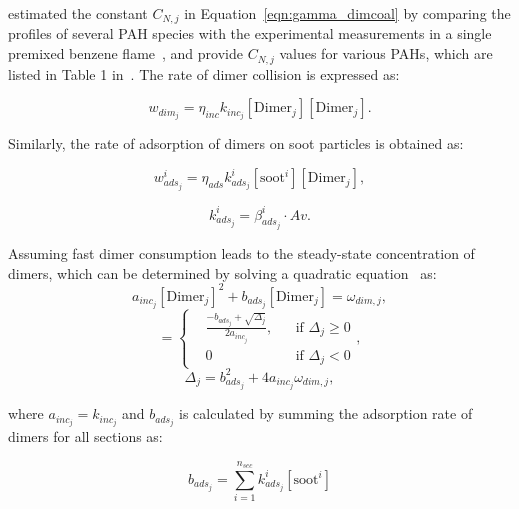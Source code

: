\citet{blanquart2009joint} estimated the constant ${C_{N,j}}$ in Equation~\eqref{eqn:gamma_dimcoal} by comparing the profiles of several PAH species with the experimental measurements in a single premixed benzene flame~\citep{tregrossi1999combustion}, and provide ${C_{N,j}}$ values for various PAHs, which are listed in Table 1 in~\citep{blanquart2009analyzing}. The rate of dimer collision is expressed as:

\begin{equation}
	w_{dim_j} = \eta_{inc} k_{inc_{j}} [\mathrm{Dimer}_j] [\mathrm{Dimer}_j].
	\label{eqn:wdim_dimcoal}
\end{equation}


Similarly, the rate of adsorption of dimers on soot particles is obtained as:

\begin{equation}
	w^i_{ads_j} = \eta_{ads} k^i_{ads_{j}} [\mathrm{soot}^i] [\mathrm{Dimer}_j],
\end{equation}

\begin{equation}
	k^i_{ads_{j}}=
	\beta^i_{ads_j}\cdot Av.
	\label{eqn:kads_dimcoal}
\end{equation}

Assuming fast dimer consumption leads to the steady-state concentration of dimers, which can be determined by solving a quadratic equation~\citep{blanquart2009analyzing} as:
\begin{equation}
	a_{inc_j}[\mathrm{Dimer}_j]^2+b_{ads_j}[\mathrm{Dimer}_j]=\omega_{dim,j},
	\label{eqn:quad_dimcoal}
\end{equation}
\begin{equation}
	[\mathrm{Dimer}_j]=
	\left\{
	\begin{aligned}
		&\frac{-b_{ads_j}+\sqrt{\Delta_j}}{2a_{inc_j}},
		&&
		\text{if } \Delta_j \ge 0
		\\
		& 0 
		&&
		\text{if } \Delta_j < 0
	\end{aligned},
	\right.
	\label{eqn:dimer_dimcoal}
\end{equation}
\begin{equation}
	\Delta_j = b_{ads_j}^2+4a_{inc_j}\omega_{dim,j},
	\label{eqn:delta_dimcoal}
\end{equation}

\noindent where ${a_{inc_j} = k_{inc_{j}}}$ and ${b_{ads_j}}$ is calculated by summing the adsorption rate of dimers for all sections as:

\begin{equation}
	b_{ads_j} = \sum_{i=1}^{n_{sec}} k^i_{ads_{j}} [\mathrm{soot}^i]
\end{equation}

